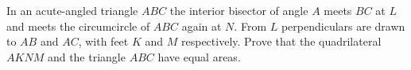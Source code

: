 In an acute-angled triangle $ABC$ the interior bisector of angle $A$ meets $BC$ at $L$ and meets the circumcircle of $ABC$ again at $N$. From $L$ perpendiculars are drawn to $AB$ and $AC$,  with feet $K$ and $M$ respectively. Prove that the quadrilateral $AKNM$ and the triangle $ABC$ have equal areas.